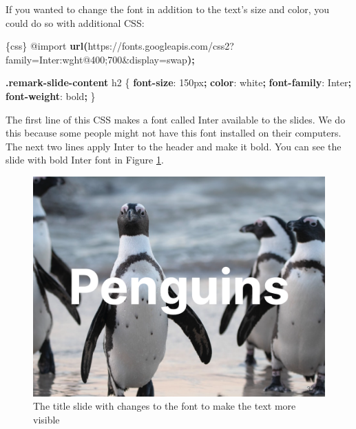 \documentclass[
]{book}
\newenvironment{Shaded}{\begin{snugshade}}{\end{snugshade}}
\newcommand{\ConstantTok}[1]{\textcolor[rgb]{0.56,0.35,0.01}{#1}}
\newcommand{\DataTypeTok}[1]{\textcolor[rgb]{0.13,0.29,0.53}{#1}}
\newcommand{\DecValTok}[1]{\textcolor[rgb]{0.00,0.00,0.81}{#1}}
\newcommand{\FunctionTok}[1]{\textcolor[rgb]{0.13,0.29,0.53}{\textbf{#1}}}
\newcommand{\ImportTok}[1]{#1}
\newcommand{\KeywordTok}[1]{\textcolor[rgb]{0.13,0.29,0.53}{\textbf{#1}}}
\newcommand{\NormalTok}[1]{#1}
\newcommand{\OperatorTok}[1]{\textcolor[rgb]{0.81,0.36,0.00}{\textbf{#1}}}
\newcommand{\StringTok}[1]{\textcolor[rgb]{0.31,0.60,0.02}{#1}}
\begin{document}
If you wanted to change the font in addition to the text's size and color, you could do so with additional CSS:

\begin{Shaded}
\begin{Highlighting}[]
\NormalTok{\textasciigrave{}\textasciigrave{}\textasciigrave{}\{css\}}
\ImportTok{@import} \FunctionTok{url(}\StringTok{\textquotesingle{}https://fonts.googleapis.com/css2?family=Inter:wght@400;700\&display=swap\textquotesingle{}}\FunctionTok{)}\OperatorTok{;}

\FunctionTok{.remark{-}slide{-}content}\NormalTok{ h2 \{}
  \KeywordTok{font{-}size}\NormalTok{: }\DecValTok{150}\DataTypeTok{px}\OperatorTok{;}
  \KeywordTok{color}\NormalTok{: }\ConstantTok{white}\OperatorTok{;}
    \KeywordTok{font{-}family}\NormalTok{: Inter}\OperatorTok{;}
  \KeywordTok{font{-}weight}\NormalTok{: }\DecValTok{bold}\OperatorTok{;}
\NormalTok{\}}
\NormalTok{\textasciigrave{}\textasciigrave{}\textasciigrave{}}
\end{Highlighting}
\end{Shaded}

The first line of this CSS makes a font called Inter available to the slides. We do this because some people might not have this font installed on their computers. The next two lines apply Inter to the header and make it bold. You can see the slide with bold Inter font in Figure \ref{fig:penguins-report-inter}.

\begin{figure}
\includegraphics[width=1\linewidth]{assets/penguins-report-inter} \caption{The title slide with changes to the font to make the text more visible}\label{fig:penguins-report-inter}
\end{figure}
\end{document}
